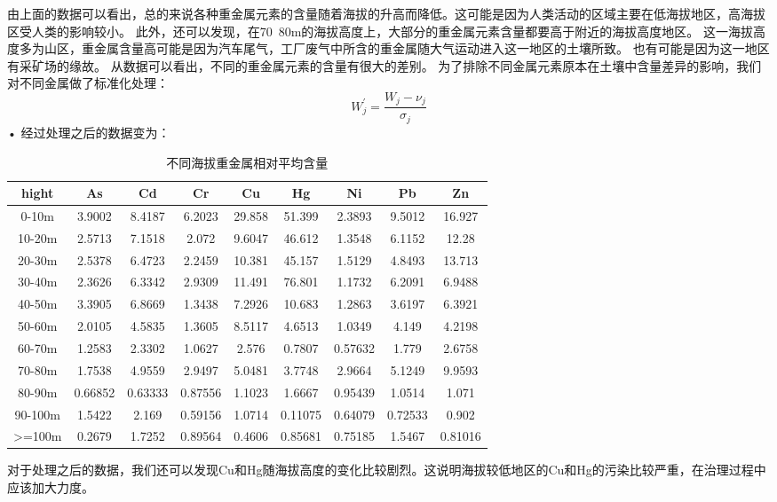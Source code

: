 \documentclass[a4paper]{article}
\begin{document}
由上面的数据可以看出，总的来说各种重金属元素的含量随着海拔的升高而降低。这可能是因为人类活动的区域主要在低海拔地区，高海拔区受人类的影响较小。
此外，还可以发现，在70~80m的海拔高度上，大部分的重金属元素含量都要高于附近的海拔高度地区。
这一海拔高度多为山区，重金属含量高可能是因为汽车尾气，工厂废气中所含的重金属随大气运动进入这一地区的土壤所致。
也有可能是因为这一地区有采矿场的缘故。
从数据可以看出，不同的重金属元素的含量有很大的差别。
为了排除不同金属元素原本在土壤中含量差异的影响，我们对不同金属做了标准化处理：
\begin{equation}
W_j^{\prime} = \frac{W_j - \nu_j}{\sigma_j}
\end{equation}•
经过处理之后的数据变为：
\begin{table}[H]
		\centering
		\caption{不同海拔重金属相对平均含量}
		\label{average-contend}
		\begin{tabular}{c|cccccccc}
			hight	  &          	As	&   Cd   &     Cr     &   Cu   &     Hg  &    Ni   &     Pb    &   Zn  \\
			\hline
			 0-10m     	&	 3.9002  &   8.4187   &  6.2023  &  29.858  &   51.399  &   2.3893  &   9.5012  &   16.927    \\
    			10-20m     	&	 2.5713  &   7.1518   &   2.072  &  9.6047  &   46.612  &   1.3548  &   6.1152  &    12.28    \\
   			20-30m    	&	 2.5378  &   6.4723   &  2.2459  &  10.381  &   45.157  &   1.5129  &   4.8493  &   13.713    \\
    			30-40m     	&	 2.3626  &   6.3342   &  2.9309  &  11.491  &   76.801  &   1.1732  &   6.2091  &   6.9488    \\
    			40-50m     	&	 3.3905  &   6.8669   &  1.3438  &  7.2926  &   10.683  &   1.2863  &   3.6197  &   6.3921    \\
    			50-60m      	&	 2.0105  &   4.5835   &  1.3605  &  8.5117  &   4.6513  &   1.0349  &    4.149  &   4.2198    \\
    			60-70m     	&	 1.2583  &   2.3302   &  1.0627  &   2.576  &   0.7807  &  0.57632  &    1.779  &   2.6758    \\
    			70-80m     	&	 1.7538  &   4.9559   &  2.9497  &  5.0481  &   3.7748  &   2.9664  &   5.1249  &   9.9593    \\
    			80-90m     	&	 0.66852 &   0.63333  &  0.87556 &   1.1023 &    1.6667 &   0.95439 &    1.0514 &     1.071   \\
    			90-100m    	&	 1.5422  &    2.169   & 0.59156  &  1.0714  &  0.11075  &  0.64079  &  0.72533  &    0.902    \\
    			>=100m    	&	 0.2679  &   1.7252   & 0.89564  &  0.4606  &  0.85681  &  0.75185  &   1.5467  &  0.81016    \\
		\end{tabular}
	\end{table}
对于处理之后的数据，我们还可以发现Cu和Hg随海拔高度的变化比较剧烈。这说明海拔较低地区的Cu和Hg的污染比较严重，在治理过程中应该加大力度。
\end{document}
